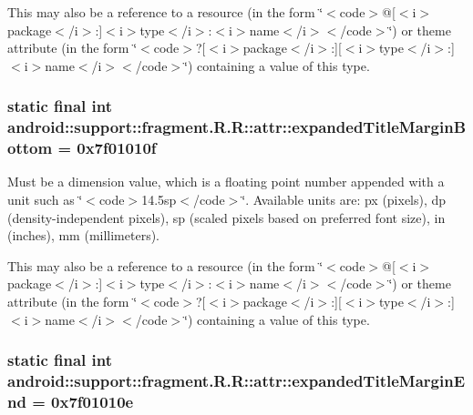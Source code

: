 This may also be a reference to a resource (in the form \char`\"{}$<$code$>$@\mbox{[}$<$i$>$package$<$/i$>$:\mbox{]}$<$i$>$type$<$/i$>$:$<$i$>$name$<$/i$>$$<$/code$>$\char`\"{}) or theme attribute (in the form \char`\"{}$<$code$>$?\mbox{[}$<$i$>$package$<$/i$>$:\mbox{]}\mbox{[}$<$i$>$type$<$/i$>$:\mbox{]}$<$i$>$name$<$/i$>$$<$/code$>$\char`\"{}) containing a value of this type. \hypertarget{classandroid_1_1support_1_1fragment_1_1_r_1_1attr_401b95cc8b5dd95a0c8857a992e62b84}{
\subsubsection[{expandedTitleMarginBottom}]{\setlength{\rightskip}{0pt plus 5cm}static final int android::support::fragment.R.R::attr::expandedTitleMarginBottom = 0x7f01010f}}
\label{classandroid_1_1support_1_1fragment_1_1_r_1_1attr_401b95cc8b5dd95a0c8857a992e62b84}


Must be a dimension value, which is a floating point number appended with a unit such as \char`\"{}$<$code$>$14.5sp$<$/code$>$\char`\"{}. Available units are: px (pixels), dp (density-independent pixels), sp (scaled pixels based on preferred font size), in (inches), mm (millimeters). 

This may also be a reference to a resource (in the form \char`\"{}$<$code$>$@\mbox{[}$<$i$>$package$<$/i$>$:\mbox{]}$<$i$>$type$<$/i$>$:$<$i$>$name$<$/i$>$$<$/code$>$\char`\"{}) or theme attribute (in the form \char`\"{}$<$code$>$?\mbox{[}$<$i$>$package$<$/i$>$:\mbox{]}\mbox{[}$<$i$>$type$<$/i$>$:\mbox{]}$<$i$>$name$<$/i$>$$<$/code$>$\char`\"{}) containing a value of this type. \hypertarget{classandroid_1_1support_1_1fragment_1_1_r_1_1attr_7351cbc40ca5d62a001cd24602888a5b}{
\subsubsection[{expandedTitleMarginEnd}]{\setlength{\rightskip}{0pt plus 5cm}static final int android::support::fragment.R.R::attr::expandedTitleMarginEnd = 0x7f01010e}}
\label{classandroid_1_1support_1_1fragment_1_1_r_1_1attr_7351cbc40ca5d62a001cd24602888a5b}


